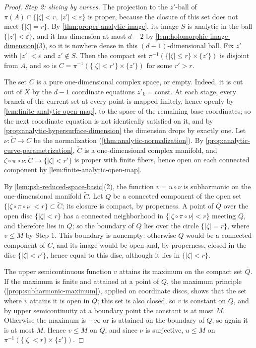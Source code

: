 \begin{proof}
\emph{Step 2: slicing by curves.} The projection to the $z'$-ball of $\pi(A)\cap\{|\zeta|<r,\ |z'|<\varepsilon\}$ is proper, because the closure of this set does not meet $\{|\zeta|=r\}$. By \cref{thm:proper-analytic-image}, its image $S$ is analytic in the ball $\{|z'|<\varepsilon\}$, and it has dimension at most $d-2$ by \cref{lem:holomorphic-image-dimension}(3), so it is nowhere dense in this $(d-1)$-dimensional ball. Fix $z'$ with $|z'|<\varepsilon$ and $z'\notin S$. Then the compact set $\pi^{-1}(\{|\zeta|\leq r\}\times\{z'\})$ is disjoint from $A$, and so is $C=\pi^{-1}(\{|\zeta|<r'\}\times\{z'\})$ for some $r'>r$.

The set $C$ is a pure one-dimensional complex space, or empty. Indeed, it is cut out of $X$ by the $d-1$ coordinate equations $z'_k=\mathrm{const}$. At each stage, every branch of the current set at every point is mapped finitely, hence openly by \cref{lem:finite-analytic-open-map}, to the space of the remaining base coordinates; so the next coordinate equation is not identically satisfied on it, and by \cref{prop:analytic-hypersurface-dimension} the dimension drops by exactly one. Let $\nu\colon\widetilde C\to C$ be the normalization (\cref{thm:analytic-normalization}). By \cref{prop:analytic-curve-parametrization}, $\widetilde C$ is a one-dimensional complex manifold, and $\zeta\circ\pi\circ\nu\colon\widetilde C\to\{|\zeta|<r'\}$ is proper with finite fibers, hence open on each connected component by \cref{lem:finite-analytic-open-map}.

By \cref{lem:psh-reduced-space-basic}(2), the function $v=u\circ\nu$ is subharmonic on the one-dimensional manifold $\widetilde C$. Let $Q$ be a connected component of the open set $\{|\zeta\circ\pi\circ\nu|<r\}\subset\widetilde C$; its closure is compact, by properness. A point of $\overline Q$ over the open disc $\{|\zeta|<r\}$ has a connected neighborhood in $\{|\zeta\circ\pi\circ\nu|<r\}$ meeting $Q$, and therefore lies in $Q$; so the boundary of $Q$ lies over the circle $\{|\zeta|=r\}$, where $v\leq M$ by Step 1. This boundary is nonempty: otherwise $Q$ would be a connected component of $\widetilde C$, and its image would be open and, by properness, closed in the disc $\{|\zeta|<r'\}$, hence equal to this disc, although it lies in $\{|\zeta|<r\}$.

The upper semicontinuous function $v$ attains its maximum on the compact set $\overline Q$. If the maximum is finite and attained at a point of $Q$, the maximum principle (\cref{prop:subharmonic-maximum}), applied on coordinate discs, shows that the set where $v$ attains it is open in $Q$; this set is also closed, so $v$ is constant on $Q$, and by upper semicontinuity at a boundary point the constant is at most $M$. Otherwise the maximum is $-\infty$ or is attained on the boundary of $Q$, so again it is at most $M$. Hence $v\leq M$ on $Q$, and since $\nu$ is surjective, $u\leq M$ on $\pi^{-1}(\{|\zeta|<r\}\times\{z'\})$.


\end{proof}
